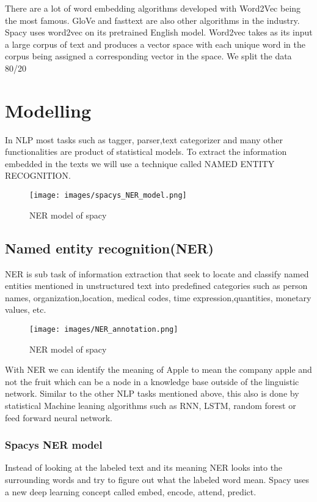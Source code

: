   There are a lot of word embedding algorithms developed with Word2Vec being the most famous. GloVe and fasttext are also other algorithms in the industry. Spacy uses  word2vec on its pretrained English model. Word2vec takes as its input a large corpus of text and produces a vector space with each unique word in the corpus being assigned a corresponding vector in the space.  
We split the data 80/20 %

\section{Modelling} 

In NLP most tasks such as tagger, parser,text categorizer and many other functionalities are product of statistical models. To extract the information embedded in the texts we will use a technique called NAMED ENTITY RECOGNITION. 
\begin{figure}[hbt!]
    \centering
    \texttt{[image: images/spacys\_NER\_model.png]}
    \caption{NER model of spacy}
    \label{fig:NER}
\end{figure}
 
\subsection{Named entity recognition(NER)}
NER is sub task of information extraction that seek to locate and classify named entities mentioned in unstructured text into predefined categories such as person names, organization,location, medical codes, time expression,quantities, monetary values, etc.  
\begin{figure}[hbt!]
    \centering
    \texttt{[image: images/NER\_annotation.png]}
    \caption{NER model of spacy}
    \label{fig:annotationl}
\end{figure} 
With NER we can identify the meaning of Apple to mean the company apple and not the fruit which can be a node in a knowledge base outside of the linguistic network. 
Similar to the other NLP tasks mentioned above, this also is done by statistical Machine leaning algorithms such as RNN, LSTM, random forest or feed forward neural network. 

\subsubsection{Spacys NER model} 
Instead of looking at the labeled text and its meaning NER looks into the surrounding words and try to figure out what the labeled word mean. Spacy uses a new deep learning concept called embed, encode, attend, predict.

